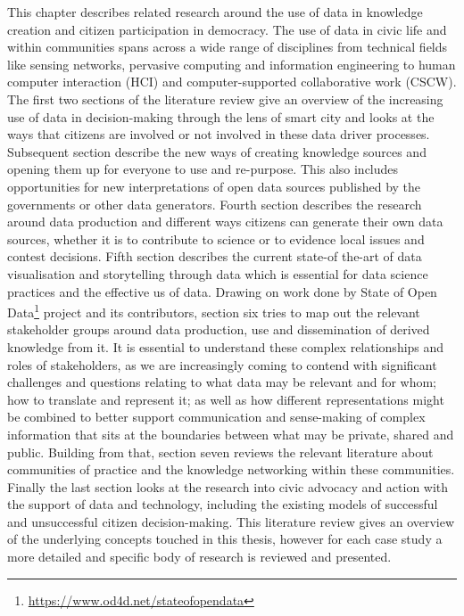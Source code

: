 This chapter describes related research around the use of data in knowledge creation and citizen participation in democracy. The use of data in civic life and within communities spans across a wide range of disciplines from technical fields like sensing networks, pervasive computing and information engineering to human computer interaction (HCI) and computer-supported collaborative work (CSCW). The first two sections of the literature review give an overview of the increasing use of data in decision-making through the lens of smart city and looks at the ways that citizens are involved or not involved in these data driver processes. Subsequent section describe the new ways of creating knowledge sources and opening them up for everyone to use and re-purpose. This also includes opportunities for new interpretations of open data sources published by the governments or other data generators. Fourth section describes the research around data production and different ways citizens can generate their own data sources, whether it is to contribute to science or to evidence local issues and contest decisions. Fifth section describes the current state-of the-art of data visualisation and storytelling through data which is essential for data science practices and the effective us of data. Drawing on work done by State of Open Data\footnote{\url{https://www.od4d.net/stateofopendata}} project and its contributors, section six tries to map out the relevant stakeholder groups around data production, use and dissemination of derived knowledge from it. It is essential to understand these complex relationships and roles of stakeholders, as we are increasingly coming to contend with significant challenges and questions relating to what data may be relevant and for whom; how to translate and represent it; as well as how different representations might be combined to better support communication and sense-making of complex information that sits at the boundaries between what may be private, shared and public. Building from that, section seven reviews the relevant literature about communities of practice and the knowledge networking within these communities. Finally the last section looks at the research into civic advocacy and action with the support of data and technology, including the existing models of successful and unsuccessful citizen decision-making. This literature review gives an overview of the underlying concepts touched in this thesis, however for each case study a more detailed and specific body of research is reviewed and presented.


